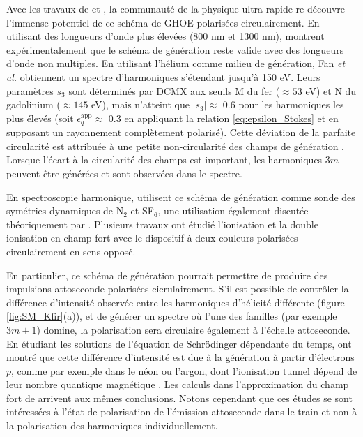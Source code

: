 Avec les travaux de  et , la communauté de la physique ultra-rapide re-découvre l'immense potentiel de ce schéma de GHOE polarisées circulairement. En utilisant des longueurs d'onde plus élevées (800 nm et 1300 nm),  montrent expérimentalement que le schéma de génération reste valide avec des longueurs d'onde non multiples. En utilisant l'hélium comme milieu de génération, Fan \textit{et al.} obtiennent un spectre d'harmoniques s'étendant jusqu'à 150 eV. Leurs paramètres $s_3$ sont déterminés par DCMX aux seuils M du fer ($\approx 53$ eV) et N du gadolinium ($\approx 145$ eV), mais n'atteint que $|s_3| \approx$ 0.6 pour les harmoniques les plus élevés (soit $\epsilon_{q}^{\text{app}} \approx$ 0.3 en appliquant la relation \ref{eq:epsilon_Stokes} et en supposant un rayonnement complètement polarisé). Cette déviation de la parfaite circularité est attribuée à une petite non-circularité des champs de génération . Lorsque l'écart à la circularité des champs est important, les harmoniques $3m$ peuvent être générées et sont observées dans le spectre.

En spectroscopie harmonique,  utilisent ce schéma de génération comme sonde des symétries dynamiques de N$_2$ et SF$_6$, une utilisation également discutée théoriquement par . Plusieurs travaux ont étudié l'ionisation  et la double ionisation  en champ fort avec le dispositif à deux couleurs polarisées circulairement en sens opposé.

En particulier, ce schéma de génération pourrait permettre de produire des impulsions attoseconde polarisées cicrulairement. S'il est possible de contrôler la différence d'intensité observée entre les harmoniques d'hélicité différente (figure \ref{fig:SM_Kfir}(a)), et de générer un spectre où l'une des familles (par exemple $3m+1$) domine, la polarisation sera circulaire également à l'échelle attoseconde. En étudiant les solutions de l'équation de Schrödinger dépendante du temps,  ont montré que cette différence d'intensité est due à la génération à partir d'électrons $p$, comme par exemple dans le néon ou l'argon, dont l'ionisation tunnel dépend de leur nombre quantique magnétique . Les calculs dans l'approximation du champ fort de  arrivent aux mêmes conclusions. Notons cependant que ces études se sont intéressées à l'état de polarisation de l'émission attoseconde dans le train et non à la polarisation des harmoniques individuellement. 

